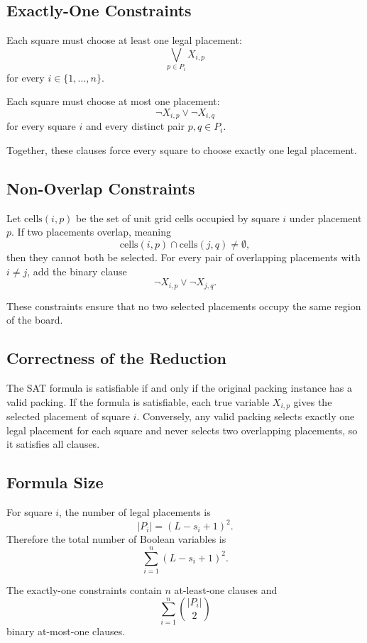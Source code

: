 \documentclass[11pt]{article}
\begin{document}
\subsection{Exactly-One Constraints}

Each square must choose at least one legal placement:
\[
\bigvee_{p \in P_i} X_{i,p}
\]
for every \(i \in \{1,\ldots,n\}\).

Each square must choose at most one placement:
\[
\neg X_{i,p} \vee \neg X_{i,q}
\]
for every square \(i\) and every distinct pair \(p,q \in P_i\).

Together, these clauses force every square to choose exactly one legal
placement.

\subsection{Non-Overlap Constraints}

Let \(\mathrm{cells}(i,p)\) be the set of unit grid cells occupied by square
\(i\) under placement \(p\). If two placements overlap, meaning
\[
\mathrm{cells}(i,p) \cap \mathrm{cells}(j,q) \neq \emptyset,
\]
then they cannot both be selected. For every pair of overlapping placements
with \(i \neq j\), add the binary clause
\[
\neg X_{i,p} \vee \neg X_{j,q}.
\]

These constraints ensure that no two selected placements occupy the same
region of the board.

\subsection{Correctness of the Reduction}

The SAT formula is satisfiable if and only if the original packing instance
has a valid packing. If the formula is satisfiable, each true variable
\(X_{i,p}\) gives the selected placement of square \(i\). Conversely, any
valid packing selects exactly one legal placement for each square and never
selects two overlapping placements, so it satisfies all clauses.

\subsection{Formula Size}

For square \(i\), the number of legal placements is
\[
|P_i| = (L-s_i+1)^2.
\]
Therefore the total number of Boolean variables is
\[
\sum_{i=1}^{n} (L-s_i+1)^2.
\]

The exactly-one constraints contain \(n\) at-least-one clauses and
\[
\sum_{i=1}^{n} \binom{|P_i|}{2}
\]
binary at-most-one clauses.
\end{document}
